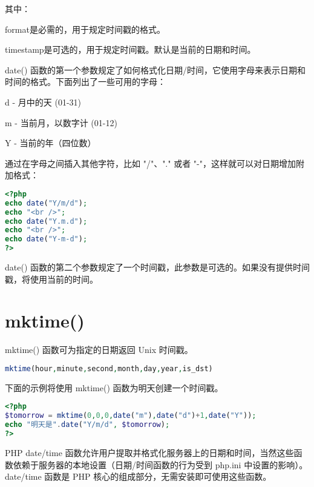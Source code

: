 其中：

\begin{compactitem}
\item format是必需的，用于规定时间戳的格式。
\item timestamp是可选的，用于规定时间戳。默认是当前的日期和时间。
\end{compactitem}


date() 函数的第一个参数规定了如何格式化日期/时间，它使用字母来表示日期和时间的格式。下面列出了一些可用的字母：

\begin{compactitem}
\item d - 月中的天 (01-31)
\item m - 当前月，以数字计 (01-12)
\item Y - 当前的年（四位数）
\end{compactitem}

通过在字母之间插入其他字符，比如 "/"、"." 或者 "-"，这样就可以对日期增加附加格式：


\begin{lstlisting}[language=PHP]
<?php
echo date("Y/m/d");
echo "<br />";
echo date("Y.m.d");
echo "<br />";
echo date("Y-m-d");
?>
\end{lstlisting}

date() 函数的第二个参数规定了一个时间戳，此参数是可选的。如果没有提供时间戳，将使用当前的时间。

\section{mktime()}


mktime() 函数可为指定的日期返回 Unix 时间戳。

\begin{lstlisting}[language=PHP]
mktime(hour,minute,second,month,day,year,is_dst)
\end{lstlisting}

下面的示例将使用 mktime() 函数为明天创建一个时间戳。


\begin{lstlisting}[language=PHP]
<?php
$tomorrow = mktime(0,0,0,date("m"),date("d")+1,date("Y"));
echo "明天是".date("Y/m/d", $tomorrow);
?>
\end{lstlisting}

PHP date/time 函数允许用户提取并格式化服务器上的日期和时间，当然这些函数依赖于服务器的本地设置（日期/时间函数的行为受到 php.ini 中设置的影响）。date/time 函数是 PHP 核心的组成部分，无需安装即可使用这些函数。


